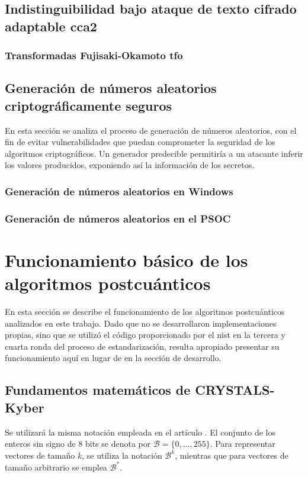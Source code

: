 \subsection{Indistinguibilidad bajo ataque de texto cifrado adaptable \gls{cca2}}
\cite{CCA2}
\subsubsection{Transformadas Fujisaki-Okamoto \gls{tfo}}
\cite{Fujisaki1999}

\subsection{Generación de números aleatorios criptográficamente seguros}
En esta sección se analiza el proceso de generación de números aleatorios, con el fin de evitar vulnerabilidades que puedan comprometer la seguridad de los algoritmos criptográficos. Un generador predecible permitiría a un atacante inferir los valores producidos, exponiendo así la información de los secretos.
\subsubsection{Generación de números aleatorios en Windows}
\cite{rngWIN}
\subsubsection{Generación de números aleatorios en el PSOC}
\newpage
\section{Funcionamiento básico de los algoritmos postcuánticos}
En esta sección se describe el funcionamiento de los algoritmos postcuánticos analizados en este trabajo. Dado que no se desarrollaron implementaciones propias, sino que se utilizó el código proporcionado por el \gls{nist} en la tercera \cite{nistPQCround3} y cuarta \cite{nistPQCround4} ronda del proceso de estandarización, resulta apropiado presentar su funcionamiento aquí en lugar de en la sección de desarrollo.
\subsection{Fundamentos matemáticos de CRYSTALS-Kyber }
Se utilizará la misma notación empleada en el artículo \cite{kyber-spec-2021}. El conjunto de los enteros sin signo de 8 bits se denota por \(\mathcal{B} = \{0, \dots, 255\}\). Para representar vectores de tamaño \(k\), se utiliza la notación \(\mathcal{B}^k\), mientras que para vectores de tamaño arbitrario se emplea \(\mathcal{B}^*\).
\newline

